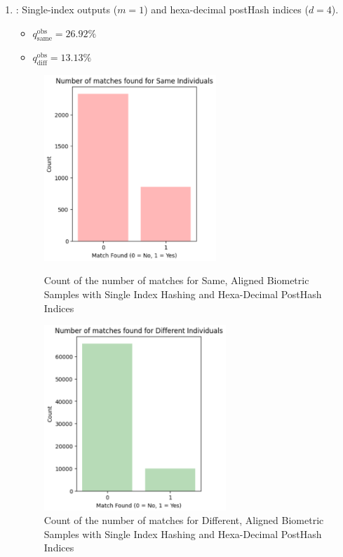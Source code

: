 \begin{enumerate}
    \item {}: Single-index outputs (\(m=1\)) and hexa-decimal postHash indices (\(d=4\)).
    \begin{itemize}
        \item \(q_{\text{same}}^{\text{obs}} = 26.92\%\)
        \item \(q_{\text{diff}}^{\text{obs}} = 13.13\%\)
    \end{itemize}

    \begin{figure}[H]
        \centering
        \begin{minipage}[b]{0.48\linewidth}
            \centering
            \includegraphics[width=\linewidth,height=7cm,keepaspectratio]{latex-img/d4same.png}
            \caption{Count of the number of matches for Same, Aligned Biometric Samples with Single Index Hashing and Hexa-Decimal PostHash Indices}
            \label{mu_same}
        \end{minipage}
        \hfill
        \begin{minipage}[b]{0.48\linewidth}
            \centering
            \includegraphics[width=\linewidth,height=7cm,keepaspectratio]{latex-img/d4diff.png}
            \caption{Count of the number of matches for Different, Aligned Biometric Samples with Single Index Hashing and Hexa-Decimal PostHash Indices}
            \label{mu_diff}
        \end{minipage}
    \end{figure}
\end{enumerate}

